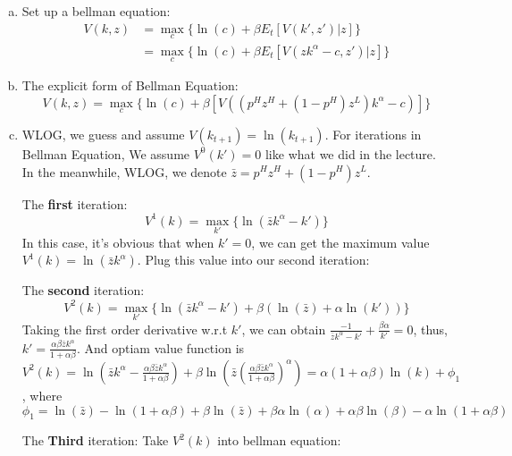 \documentclass[11pt]{article} %
\begin{document}
\begin{enumerate}[a.]
	\item Set up a bellman equation:
		\begin{align*}
			V(k,z)&=\max_c\{\ln(c)+\beta E_t[V(k',z')|z]\}\\
				&=\max_c\{\ln(c)+\beta  E_t[V(zk^\alpha-c,z')|z]\}
		\end{align*}
	\item The explicit form of Bellman Equation:
		\begin{equation*}
			V(k,z)=\max_c\{\ln(c)+\beta [V((p^Hz^H+(1-p^H)z^L)k^\alpha-c)]\}
		\end{equation*}
	\item WLOG, we guess and assume $V(k_{t+1})=\ln(k_{t+1})$. For iterations in Bellman Equation, We assume $V^0(k')=0$ like what we did in the lecture.
		In the meanwhile, WLOG, we denote $\bar{z}=p^Hz^H+(1-p^H)z^L$.

		The \textbf{first} iteration:
		\begin{equation*}
			V^1(k)=\max_{k'}\{\ln(\bar{z}k^\alpha-k')\}
		\end{equation*}
		In this case, it's obvious that when $k'=0$, we can get the maximum value $V^1(k)=\ln(\bar{z}k^\alpha)$. Plug this value into our second iteration:

		The \textbf{second} iteration:
		\begin{equation*}
			V^2(k)=\max_{k'}\{\ln(\bar{z}k^\alpha-k')+\beta(\ln(\bar{z})+\alpha\ln(k'))\}
		\end{equation*}
		Taking the first order derivative w.r.t $k'$, we can obtain $\frac{-1}{\bar{z}k^\alpha-k'}+\frac{\beta\alpha}{k'}=0$, thus, $k'=\frac{\alpha\beta\bar{z}k^\alpha}{1+\alpha\beta}$. And optiam value function is $V^2(k)=\ln(\bar{z}k^\alpha-\frac{\alpha\beta\bar{z}k^\alpha}{1+\alpha\beta})+\beta\ln(\bar{z}(\frac{\alpha\beta\bar{z}k^\alpha}{1+\alpha\beta})^\alpha)=\alpha(1+\alpha\beta)\ln(k)+\phi_1$, 
		where $\phi_1=\ln(\bar{z})-\ln(1+\alpha\beta)+\beta\ln(\bar{z})+\beta\alpha\ln(\alpha)+\alpha\beta\ln(\beta)-\alpha\ln(1+\alpha\beta)$

		The \textbf{Third} iteration:
		Take $V^2(k)$ into bellman equation:


\end{enumerate}
\end{document}
